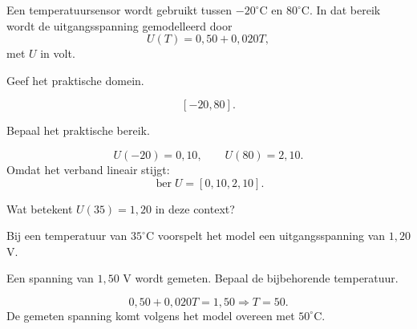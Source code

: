 \documentclass{ximera}
\begin{document}
\begin{oefening}{\oefU\ESS}

Een temperatuursensor wordt gebruikt tussen \(-20^\circ\mathrm C\) en
\(80^\circ\mathrm C\). In dat bereik wordt de uitgangsspanning gemodelleerd door
\[
U(T)=0{,}50+0{,}020T,
\]
met \(U\) in volt.

\begin{question}
Geef het praktische domein.

\begin{oplossing}
\[
[-20,80].
\]
\end{oplossing}
\end{question}

\begin{question}
Bepaal het praktische bereik.

\begin{oplossing}
\[
U(-20)=0{,}10,\qquad U(80)=2{,}10.
\]
Omdat het verband lineair stijgt:
\[
\operatorname{ber}U=[0{,}10,2{,}10].
\]
\end{oplossing}
\end{question}

\begin{question}
Wat betekent \(U(35)=1{,}20\) in deze context?

\begin{oplossing}
Bij een temperatuur van \(35^\circ\mathrm C\) voorspelt het model een
uitgangsspanning van \(1{,}20\) V.
\end{oplossing}
\end{question}

\begin{question}
Een spanning van \(1{,}50\) V wordt gemeten. Bepaal de bijbehorende temperatuur.

\begin{oplossing}
\[
0{,}50+0{,}020T=1{,}50
\Longrightarrow
T=50.
\]
De gemeten spanning komt volgens het model overeen met \(50^\circ\mathrm C\).
\end{oplossing}
\end{question}

\end{oefening}
\end{document}
